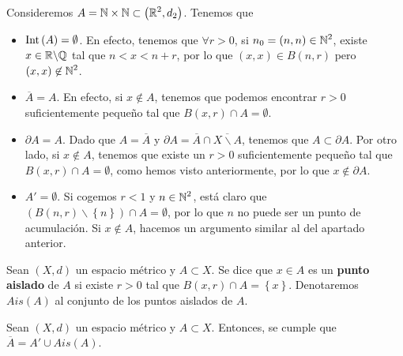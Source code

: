 \begin{eg}
Consideremos $\displaystyle A = \mathbb{N} \times \mathbb{N} \subset \left(\mathbb{R}^{2}, d _{2}\right)$. Tenemos que 
\begin{itemize}
\item $\displaystyle \operatorname{Int}\left(A\right) = \emptyset $. En efecto, tenemos que $\displaystyle \forall r > 0 $, si $\displaystyle n_{0} = \left(n,n\right) \in \mathbb{N}^{2} $, existe $\displaystyle x \in \mathbb{R}\backslash\mathbb{Q} $ tal que $\displaystyle n < x < n + r $, por lo que $\displaystyle \left(x,x\right) \in B\left(n,r\right) $ pero $\displaystyle \left(x,x\right)\not\in \mathbb{N}^{2} $.
\item $\displaystyle \overline{A} = A $. En efecto, si $\displaystyle x \not\in A$, tenemos que podemos encontrar $\displaystyle r > 0 $ suficientemente pequeño tal que $\displaystyle B\left(x,r\right) \cap A = \emptyset $.
\item $\displaystyle \partial A = A $. Dado que $\displaystyle A = \overline{A} $ y $\displaystyle \partial A= \overline{A} \cap \overline{X\backslash A} $, tenemos que $\displaystyle A \subset \partial A $. Por otro lado, si $\displaystyle x \not\in A $, tenemos que existe un $\displaystyle r>0 $ suficientemente pequeño tal que $\displaystyle B\left(x,r\right) \cap A = \emptyset $, como hemos visto anteriormente, por lo que $\displaystyle x \not\in \partial A $. 
\item $\displaystyle A' = \emptyset $. Si cogemos $\displaystyle r < 1 $ y $\displaystyle n \in \mathbb{N}^{2} $, está claro que $\displaystyle \left(B\left(n,r\right)\backslash \left\{ n\right\} \right) \cap A = \emptyset $, por lo que $\displaystyle n $ no puede ser un punto de acumulación. Si $\displaystyle x \not\in A $, hacemos un argumento similar al del apartado anterior.
\end{itemize}
\end{eg}
\begin{definition}
	Sean $\displaystyle \left(X,d\right) $ un espacio métrico y $\displaystyle A \subset X $. Se dice que $\displaystyle x \in A $ es un \textbf{punto aislado} de $\displaystyle A $ si existe $\displaystyle r > 0 $ tal que $\displaystyle B\left(x,r\right) \cap A = \left\{ x\right\}  $. Denotaremos $\displaystyle Ais\left(A\right) $ al conjunto de los puntos aislados de $\displaystyle A $.
\end{definition}
\begin{prop}
Sean $\displaystyle \left(X, d\right) $ un espacio métrico y $\displaystyle A \subset X $. Entonces, se cumple que $\displaystyle \overline{A} = A' \cup Ais\left(A\right) $.
\end{prop}
